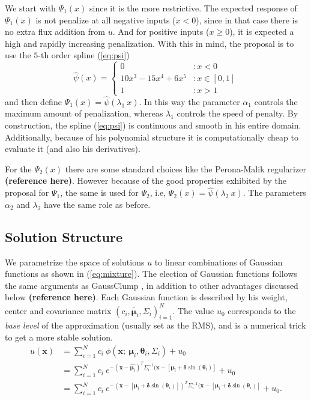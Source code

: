 \documentclass{article}
\begin{document}
We start with $\Psi_1(x)$ since it is the more restrictive. The expected response of $\Psi_1(x)$ is not penalize at all negative inputs ($x < 0$), since in that case there is no extra flux addition from $u$. And for positive inputs ($x \geq 0$), it is expected a high and rapidly increasing penalization. With this in mind, the proposal is to use the $5$-th order spline (\ref{eq:psi})
\begin{equation}
 \widehat{\psi}(x) = \left\{
     \begin{array}{lr}
       0  & : x < 0 \\
       10 x^3 - 15 x^4 + 6 x^5 & : x \in [0,1]\\
       1 & : x >1
     \end{array}
\label{eq:psi}
\end{equation}
and then define $\Psi_1(x) = \widehat{\psi}(\lambda_1 \ x)$. In this way the parameter $\alpha_1$ controls the maximum amount of penalization, whereas $\lambda_1$ controls the speed of penalty. By construction, the spline (\ref{eq:psi}) is continuous and smooth in his entire domain. Additionally, because of his polynomial structure it is computationally cheap to evaluate it (and also his derivatives).

For the $\Psi_2(x)$ there are some standard choices like the Perona-Malik regularizer \textbf{(reference here)}. However because of the good properties exhibited by the proposal for $\Psi_1$, the same is used for $\Psi_2$, i.e, $\Psi_2(x) = \widehat{\psi}(\lambda_2 \ x)$. The parameters $\alpha_2$ and $\lambda_2$ have the same role as before.



\subsection{Solution Structure}

We parametrize the space of solutions $u$ to linear combinations of Gaussian functions as shown in (\ref{eq:mixture}). The election of Gaussian functions follows the same arguments as GaussClump \cite{Stutzki}, in addition to other advantages discussed below \textbf{(reference here)}. Each Gaussian function is described by his weight, center and covariance matrix $(c_i, \tilde{\boldsymbol{\mu}_i}, \Sigma_i)_{i=1}^N$. The value $u_0$ corresponds to the \textit{base level} of the approximation (usually set as the RMS), and is a  numerical trick to get a more stable solution.
\begin{align}
u(\mathbf{x}) &= \sum_{i=1}^N c_i \ \phi(\mathbf{x};\ \boldsymbol{\mu}_i, \boldsymbol{\theta}_i, \Sigma_{i}) + u_0 \\
&= \sum_{i=1}^N c_i \ e^{-(\mathbf{x}- \hat{\boldsymbol{\mu}_i})^T \Sigma_{i}^{-1} (\mathbf{x}-[\boldsymbol{\mu}_i + \boldsymbol{\delta} \sin(\boldsymbol{\theta}_i)]} + u_0 \\
&= \sum_{i=1}^N c_i \ e^{-(\mathbf{x}-[\boldsymbol{\mu}_i + \boldsymbol{\delta} \sin(\boldsymbol{\theta}_i)])^T \Sigma_{i}^{-1} (\mathbf{x}-[\boldsymbol{\mu}_i + \boldsymbol{\delta} \sin(\boldsymbol{\theta}_i)]} + u_0.
\label{eq:mixture}
\end{align}
\end{document}

